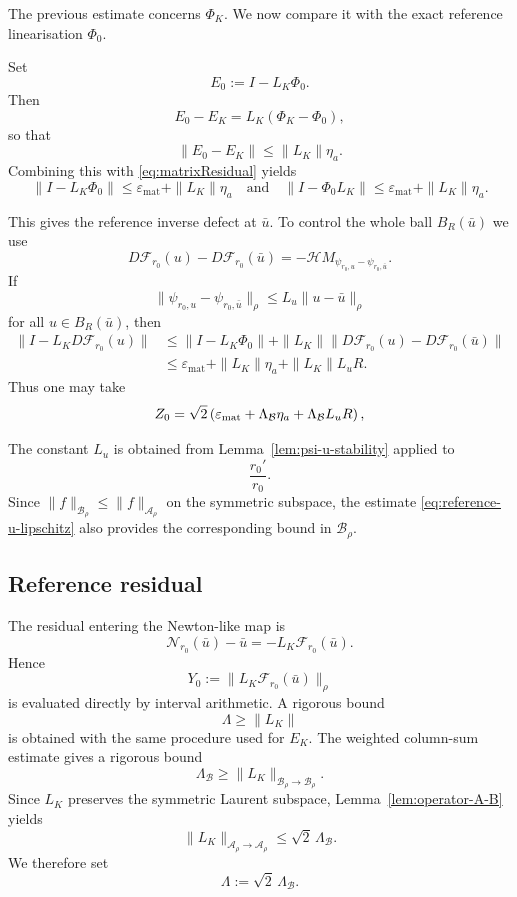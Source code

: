 \documentclass[11pt,a4paper]{amsart}
\begin{document}
The previous estimate concerns $\Phi_K$. We now compare it with the
exact reference linearisation $\Phi_0$.

Set
\[
E_0
:=
I-L_K\Phi_0.
\]
Then
\[
E_0-E_K
=
L_K(\Phi_K-\Phi_0),
\]
so that
\[
\|E_0-E_K\|
\le
\|L_K\|\eta_a.
\]
Combining this with \eqref{eq:matrixResidual} yields
\begin{equation}\label{eq:reference-linear-residual}
	\|I-L_K\Phi_0\|\le\varepsilon_{\mathrm{mat}}+\|L_K\|\eta_a\quad\text{and}\quad
	\|I-\Phi_0L_K\|\le\varepsilon_{\mathrm{mat}}+\|L_K\|\eta_a.
\end{equation}

This gives the reference inverse defect at $\bar u$. To control the
whole ball $B_R(\bar u)$ we use
\[
D\mathcal F_{r_0}(u)-D\mathcal F_{r_0}(\bar u)
=
-\mathcal H
M_{\psi_{r_0,u}-\psi_{r_0,\bar u}}.
\]
If
\begin{equation}\label{eq:reference-u-lipschitz}
	\|\psi_{r_0,u}-\psi_{r_0,\bar u}\|_\rho
	\le
	L_u\|u-\bar u\|_\rho
\end{equation}
for all $u\in B_R(\bar u)$, then
\[
\begin{aligned}
	\|I-L_KD\mathcal F_{r_0}(u)\|
	&\le
	\|I-L_K\Phi_0\|+\|L_K\|\|D\mathcal F_{r_0}(u)-D\mathcal F_{r_0}(\bar u)\| \\
	&\le\varepsilon_{\mathrm{mat}}+\|L_K\|\eta_a+\|L_K\|L_uR.
\end{aligned}
\]
Thus one may take
\begin{equation}\label{eq:Z0-computable}
Z_0
=
\sqrt2\left(
\varepsilon_{\rm mat}
+\Lambda_{\mathcal B}\eta_a
+\Lambda_{\mathcal B}L_uR
\right),
\end{equation}

The constant $L_u$ is obtained from
Lemma~\ref{lem:psi-u-stability} applied to
\[
\frac{r_0'}{r_0}.
\]
Since \(\|f\|_{\mathcal B_\rho}\le \|f\|_{\mathcal A_\rho}\) on the symmetric subspace, the estimate \eqref{eq:reference-u-lipschitz} also provides the corresponding bound in \(\mathcal B_\rho\).

\subsection{Reference residual}

The residual entering the Newton-like map is
\[
\mathcal N_{r_0}(\bar u)-\bar u
=
-L_K\mathcal F_{r_0}(\bar u).
\]
Hence
\begin{equation}\label{eq:Y0-computable}
	Y_0
	:=
	\|L_K\mathcal F_{r_0}(\bar u)\|_\rho
\end{equation}
is evaluated directly by interval arithmetic. A rigorous bound
\begin{equation}\label{eq:lambda2}
\Lambda\ge\|L_K\|
\end{equation}
is obtained with the same procedure used for $E_K$.
The weighted column-sum estimate gives a rigorous bound
\[
\Lambda_{\mathcal B}
\ge
\|L_K\|_{\mathcal B_\rho\to\mathcal B_\rho}.
\]
Since $L_K$ preserves the symmetric Laurent subspace,
Lemma~\ref{lem:operator-A-B} yields
\[
\|L_K\|_{\mathcal A_\rho\to\mathcal A_\rho}
\le
\sqrt2\,\Lambda_{\mathcal B}.
\]
We therefore set
\begin{equation}\label{eq:lambda}
	\Lambda
	:=
	\sqrt2\,\Lambda_{\mathcal B}.
\end{equation}
\end{document}
